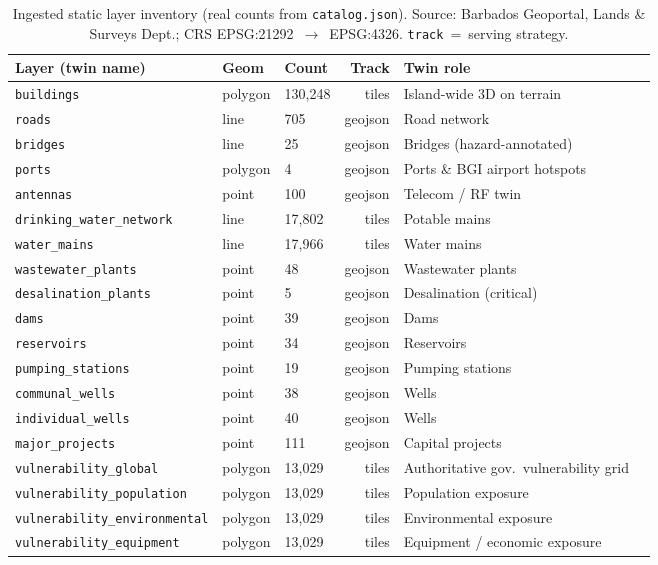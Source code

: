\documentclass[10pt,twocolumn]{article}
\begin{document}
\begin{table}[t]\scriptsize\centering
\caption{Ingested static layer inventory (real counts from \texttt{catalog.json}).
Source: Barbados Geoportal, Lands \& Surveys Dept.; CRS EPSG:21292~$\rightarrow$~EPSG:4326.
\texttt{track}~=~serving strategy.}\label{tab:layers}
\begin{tabular}{@{}p{3.2cm}llrl@{\hskip 10pt}p{6.6cm}@{}}
\toprule
Layer (twin name) & Geom & Count & Track & Twin role\\
\midrule
\texttt{buildings} & polygon & 130{,}248 & tiles & Island-wide 3D on terrain\\
\texttt{roads} & line & 705 & geojson & Road network\\
\texttt{bridges} & line & 25 & geojson & Bridges (hazard-annotated)\\
\texttt{ports} & polygon & 4 & geojson & Ports \& BGI airport hotspots\\
\texttt{antennas} & point & 100 & geojson & Telecom / RF twin\\
\texttt{drinking\_water\_network} & line & 17{,}802 & tiles & Potable mains\\
\texttt{water\_mains} & line & 17{,}966 & tiles & Water mains\\
\texttt{wastewater\_plants} & point & 48 & geojson & Wastewater plants\\
\texttt{desalination\_plants} & point & 5 & geojson & Desalination (critical)\\
\texttt{dams} & point & 39 & geojson & Dams\\
\texttt{reservoirs} & point & 34 & geojson & Reservoirs\\
\texttt{pumping\_stations} & point & 19 & geojson & Pumping stations\\
\texttt{communal\_wells} & point & 38 & geojson & Wells\\
\texttt{individual\_wells} & point & 40 & geojson & Wells\\
\texttt{major\_projects} & point & 111 & geojson & Capital projects\\
\texttt{vulnerability\_global} & polygon & 13{,}029 & tiles & Authoritative gov.\ vulnerability grid\\
\texttt{vulnerability\_population} & polygon & 13{,}029 & tiles & Population exposure\\
\texttt{vulnerability\_environmental} & polygon & 13{,}029 & tiles & Environmental exposure\\
\texttt{vulnerability\_equipment} & polygon & 13{,}029 & tiles & Equipment / economic exposure\\
\bottomrule
\end{tabular}
\end{table}
\end{document}
